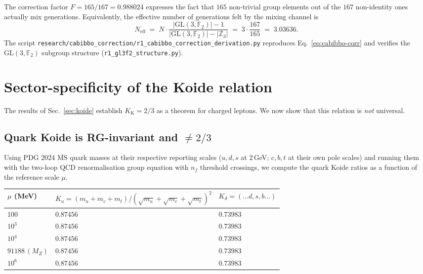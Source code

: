 \documentclass[11pt,a4paper]{article}
\newcommand{\Kkoide}{K_{\mathrm{K}}}
\newcommand{\GLtf}{\mathrm{GL}(3,\mathbb{F}_{2})}
\newcommand{\Zthree}{\mathbb{Z}_{3}}
\begin{document}
\noindent
The correction factor $F=165/167=0.988024$ expresses the fact that
$165$ non-trivial group elements out of the $167$ non-identity ones
actually mix generations. Equivalently, the effective number of
generations felt by the mixing channel is
\begin{equation}\label{eq:Neff}
  N_{\mathrm{eff}} \;=\; N\cdot\frac{|\GLtf|-1}{|\GLtf|-|\Zthree|}
  \;=\; 3\cdot \frac{167}{165} \;=\; 3.03636.
\end{equation}
The script
\verb|research/cabibbo_correction/r1_cabibbo_correction_derivation.py|
reproduces Eq.~\eqref{eq:cabibbo-corr} and verifies the $\GLtf$ subgroup
structure (\verb|r1_gl3f2_structure.py|).

\section{Sector-specificity of the Koide relation}\label{sec:sector-specific}

The results of Sec.~\ref{sec:koide} establish $\Kkoide=2/3$ as a theorem
for charged leptons. We now show that this relation is \emph{not}
universal.

\subsection{Quark Koide is RG-invariant and $\neq 2/3$}

Using PDG 2024 $\overline{\mathrm{MS}}$ quark masses at their respective
reporting scales ($u,d,s$ at $2$\,GeV; $c,b,t$ at their own pole
scales) and running them with the two-loop QCD renormalisation group
equation with $n_{f}$ threshold crossings, we compute the quark Koide
ratios as a function of the reference scale $\mu$.

\begin{center}\small
{}\label{tab:quark-koide}
\begin{tabular}{@{}lll@{}}
\toprule
$\mu$ (MeV) & $K_{u}=(m_{u}+m_{c}+m_{t})/(\sqrt{m_{u}}+\sqrt{m_{c}}+\sqrt{m_{t}})^{2}$
            & $K_{d}=(\ldots d,s,b\ldots)$\\
\midrule
$100$          & $0.87456$ & $0.73983$\\
$10^{3}$       & $0.87456$ & $0.73983$\\
$10^{4}$       & $0.87456$ & $0.73983$\\
$91188\,(M_{Z})$ & $0.87456$ & $0.73983$\\
$10^{6}$       & $0.87456$ & $0.73983$\\
\bottomrule
\end{tabular}
\end{center}
\end{document}

